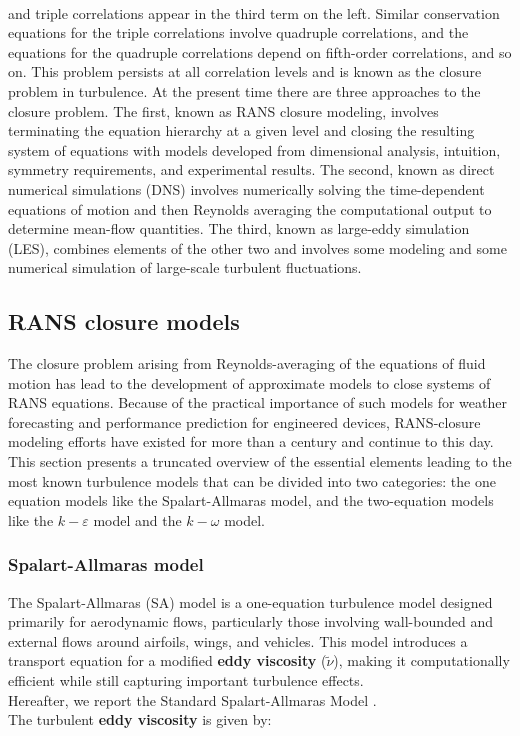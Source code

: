 \documentclass[a5paper]{sapthesis}
\begin{document}
	\\
	and triple correlations appear in the third term on the left. Similar conservation equations for the triple correlations involve quadruple correlations, and the equations for the quadruple correlations depend on fifth-order correlations, and so on. This problem persists at all correlation levels and is known as the closure problem in turbulence. At the present time there are three approaches to the closure problem. The first, known as RANS closure
	modeling, involves terminating the equation hierarchy at a given level and closing the resulting system of equations with models developed from dimensional analysis, 	intuition, symmetry requirements, and experimental results. The second, known as direct numerical simulations (DNS) involves numerically solving the time-dependent equations of motion and
	then Reynolds averaging the computational output to determine mean-flow quantities. The third, known as large-eddy simulation (LES), combines elements of the other two and involves some modeling and some numerical simulation of large-scale turbulent fluctuations.
	
	\subsection{RANS closure models}
	The closure problem arising from Reynolds-averaging of the equations of fluid motion has lead to the development of approximate models to close systems of RANS equations. Because
	of the practical importance of such models for weather forecasting and performance prediction for engineered devices, RANS-closure modeling efforts have existed for more than a century and continue to this day. This section presents a truncated overview of the essential elements leading to the most known turbulence models that can be divided into two categories: the one equation models like the Spalart-Allmaras model, and the two-equation models like the $k-\varepsilon$ model and the $k-\omega$ model.
	
	\subsubsection{Spalart-Allmaras model}
	The Spalart-Allmaras (SA) model is a one-equation turbulence model designed primarily for aerodynamic flows, particularly those involving wall-bounded and external flows around airfoils, wings, and vehicles. This model introduces a transport equation for a modified \textbf{eddy viscosity} ($\tilde{\nu}$), making it computationally efficient while still capturing important turbulence effects. \\
	Hereafter, we report the Standard Spalart-Allmaras Model \cite{SPALARTALLMARAS}.
	 \\
	The turbulent \textbf{eddy viscosity} is given by:
	
\end{document}
